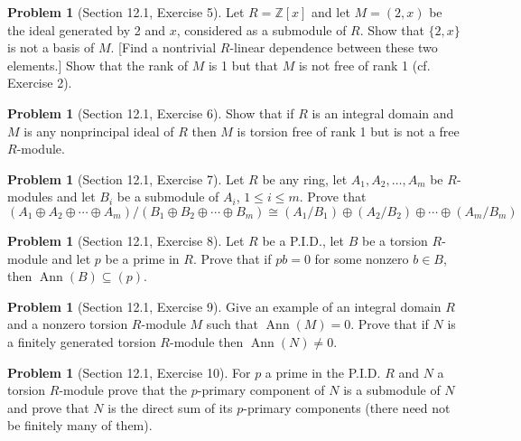 \documentclass{amsart}
\numberwithin{equation}{section}
\theoremstyle{definition}
\newtheorem{problem}[thm]{Problem}
\begin{document}
\begin{problem}[Section 12.1, Exercise 5]
 Let \(R=\mathbb{Z}[x]\) and let \(M=(2, x)\) be the ideal generated by 2 and \(x\), considered as a submodule of \(R\). Show that \(\{2, x\}\) is not a basis of \(M\). [Find a nontrivial \(R\)-linear dependence between these two elements.] Show that the rank of \(M\) is 1 but that \(M\) is not free of rank 1 (cf. Exercise 2). 
\end{problem}


\begin{problem}[Section 12.1, Exercise 6]
 Show that if \(R\) is an integral domain and \(M\) is any nonprincipal ideal of \(R\) then \(M\) is torsion free of rank 1 but is not a free \(R\)-module. 
\end{problem}


\begin{problem}[Section 12.1, Exercise 7]
 Let \(R\) be any ring, let \(A_1, A_2, \ldots, A_m\) be \(R\)-modules and let \(B_i\) be a submodule of \(A_i\), \(1 \leq i \leq m\). Prove that
\[
\left(A_1 \oplus A_2 \oplus \cdots \oplus A_m\right) /\left(B_1 \oplus B_2 \oplus \cdots \oplus B_m\right) \cong\left(A_1 / B_1\right) \oplus\left(A_2 / B_2\right) \oplus \cdots \oplus\left(A_m / B_m\right)
\] 
\end{problem}


\begin{problem}[Section 12.1, Exercise 8]
 Let \(R\) be a P.I.D., let \(B\) be a torsion \(R\)-module and let \(p\) be a prime in \(R\). Prove that if \(p b=0\) for some nonzero \(b \in B\), then \(\operatorname{Ann}(B) \subseteq(p)\). 
\end{problem}


\begin{problem}[Section 12.1, Exercise 9]
 Give an example of an integral domain \(R\) and a nonzero torsion \(R\)-module \(M\) such that \(\operatorname{Ann}(M)=0\). Prove that if \(N\) is a finitely generated torsion \(R\)-module then \(\operatorname{Ann}(N) \neq 0\). 
\end{problem}


\begin{problem}[Section 12.1, Exercise 10]
 For \(p\) a prime in the P.I.D. \(R\) and \(N\) a torsion \(R\)-module prove that the \(p\)-primary component of \(N\) is a submodule of \(N\) and prove that \(N\) is the direct sum of its \(p\)-primary components (there need not be finitely many of them). 
\end{problem}
\end{document}

